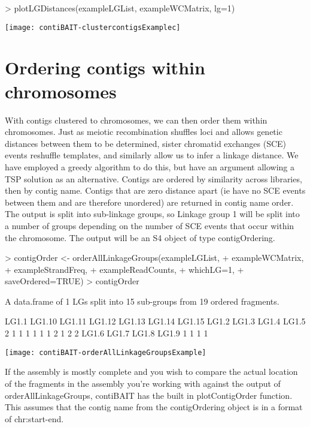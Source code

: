 \documentclass{article}
\begin{document}
\begin{Schunk}
\begin{Sinput}
> plotLGDistances(exampleLGList, exampleWCMatrix, lg=1)
\end{Sinput}
\end{Schunk}
\texttt{[image: contiBAIT-clustercontigsExamplec]}


\section{Ordering contigs within chromosomes}

With contigs clustered to chromosomes, we can then order them within chromosomes. Just as meiotic recombination shuffles loci and allows genetic distances between them to be determined, sister chromatid exchanges (SCE) events reshuffle templates, and similarly allow us to infer a linkage distance. We have employed a greedy algorithm to do this, but have an argument allowing a TSP solution as an alternative. Contigs are ordered by similarity across libraries, then by contig name. Contigs that are zero distance apart (ie have no SCE events between them and are therefore unordered) are returned in contig name order. The output is split into sub-linkage groups, so Linkage group 1 will be split into a number of groups depending on the number of SCE events that occur within the chromosome. The output will be an S4 object of type contigOrdering.

\begin{Schunk}
\begin{Sinput}
> contigOrder <- orderAllLinkageGroups(exampleLGList,
+ exampleWCMatrix,
+ exampleStrandFreq,
+ exampleReadCounts,
+ whichLG=1,
+ saveOrdered=TRUE)
> contigOrder
\end{Sinput}
\begin{Soutput}
A data.frame of 1 LGs split into 15 sub-groups from 19 ordered fragments.

 LG1.1 LG1.10 LG1.11 LG1.12 LG1.13 LG1.14 LG1.15  LG1.2  LG1.3  LG1.4  LG1.5 
     2      1      1      1      1      1      1      2      1      2      2 
 LG1.6  LG1.7  LG1.8  LG1.9 
     1      1      1      1 
\end{Soutput}
\end{Schunk}
\texttt{[image: contiBAIT-orderAllLinkageGroupsExample]}

If the assembly is mostly complete and you wish to compare the actual location of the fragments in the assembly you're working with against the output of orderAllLinkageGroups, contiBAIT has the built in plotContigOrder function. This assumes that the contig name from the contigOrdering object is in a format of chr:start-end.
\end{document}
